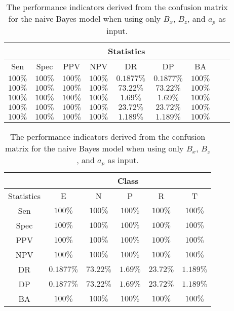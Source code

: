 \begin{table}[!ht]
	\centering
	\begin{tabular}{|c|c|c|c|c|c|c|c|c|}
		\hline
		 & \multicolumn{7}{c|}{Statistics} \\ \hline
		Sen & Spec & PPV & NPV & DR & DP & BA \\ \hline
		$100\%$ & $100\%$ & $100\%$ & $100\%$ & $0.1877\%$ & $0.1877\%$ & $100\%$ \\ \hline
		$100\%$ & $100\%$ & $100\%$ & $100\%$ & $73.22\%$ & $73.22\%$ & $100\%$ \\ \hline
		$100\%$ & $100\%$ & $100\%$ & $100\%$ & $1.69\%$ & $1.69\%$ & $100\%$ \\ \hline
		$100\%$ & $100\%$ & $100\%$ & $100\%$ & $23.72\%$ & $23.72\%$ & $100\%$ \\ \hline
		$100\%$ & $100\%$ & $100\%$ & $100\%$ & $1.189\%$ & $1.189\%$ & $100\%$ \\ \hline
	\end{tabular}
	\caption{The performance indicators derived from the confusion matrix for the naive Bayes model when using only $B_{x}$, $B_{z}$, and $a_{p}$ as input.}
	\label{tab:cs:xzap:nb}
\end{table}

\begin{table}[!ht]
	\centering
	\begin{tabular}{|c|c|c|c|c|c|}
		\hline
		 & \multicolumn{5}{c|}{Class} \\ \hline
		Statistics & E & N & P & R & T \\ \hline
		Sen & $100\%$ & $100\%$ & $100\%$ & $100\%$ & $100\%$ \\ \hline
		Spec & $100\%$ & $100\%$ & $100\%$ & $100\%$ & $100\%$ \\ \hline
		PPV & $100\%$ & $100\%$ & $100\%$ & $100\%$ & $100\%$ \\ \hline
		NPV & $100\%$ & $100\%$ & $100\%$ & $100\%$ & $100\%$ \\ \hline
		DR & $0.1877\%$ & $73.22\%$ & $1.69\%$ & $23.72\%$ & $1.189\%$ \\ \hline
		DP & $0.1877\%$ & $73.22\%$ & $1.69\%$ & $23.72\%$ & $1.189\%$ \\ \hline
		BA & $100\%$ & $100\%$ & $100\%$ & $100\%$ & $100\%$ \\ \hline
	\end{tabular}
	\caption{The performance indicators derived from the confusion matrix for the naive Bayes model when using only $B_{x}$, $B_{z}$, and $a_{p}$ as input.}
	\label{tab:cs:reverse:xzap:nb}
\end{table}

